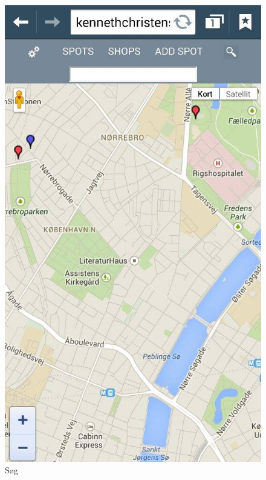 \documentclass[12pt]{article}
\begin{document}
\newpage
\begin{figure}[ht]
\begin{minipage}[b]{0.45\linewidth}
\centering
\includegraphics[width=\textwidth]{search}
\caption{Søg}
\label{fig:figure5}
\end{minipage}
\hspace{0.5cm}
\begin{minipage}[b]{0.45\linewidth}
\centering

\end{minipage}
\end{figure}
\end{document}
